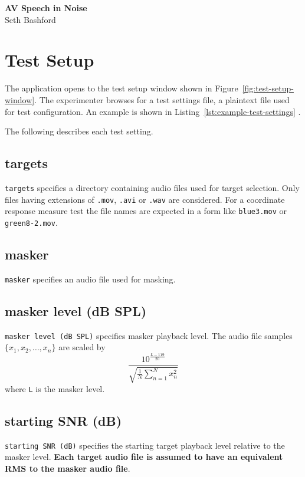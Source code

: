 \documentclass[11pt,pdftex,letterpaper]{article}
\begin{document}
\vspace*{30ex}
\begin{center}
\textbf{AV Speech in Noise}\\
\vspace{4ex}
Seth Bashford
\end{center}
\pagebreak
\tableofcontents
\pagebreak

\section{Test Setup}
The application opens to the test setup window shown in Figure~\ref{fig:test-setup-window}. The experimenter browses for a test settings file, a plaintext file used for test configuration. An example is shown in Listing~\ref{lst:example-test-settings} .

\noindent\begin{minipage}{\textwidth}
	
\end{minipage}
The following describes each test setting.
\subsection{targets}
\texttt{targets} specifies a directory containing audio files used for target selection. Only files having extensions of \texttt{.mov}, \texttt{.avi} or \texttt{.wav} are considered. For a coordinate response measure test the file names are expected in a form like \texttt{blue3.mov} or \texttt{green8-2.mov}.
\subsection{masker}
\texttt{masker} specifies an audio file used for masking.
\subsection{masker level (dB SPL)}
\texttt{masker level (dB SPL)} specifies masker playback level. The audio file samples ${\displaystyle \{x_{1}, x_{2}, \dots , x_{n}\}}$ are scaled by
\begin{equation}
 \frac{10^{\frac{L-119}{20}}}{\sqrt{\frac{1}{N}\sum_{n=1}^{N}x_{n}^{2}}}\label{eq:masker-scale}
\end{equation}
where \texttt{L} is the masker level.
\subsection{starting SNR (dB)}
\texttt{starting SNR (dB)} specifies the starting target playback level relative to the masker level. \textbf{Each target audio file is assumed to have an equivalent RMS to the masker audio file}.
\end{document}
